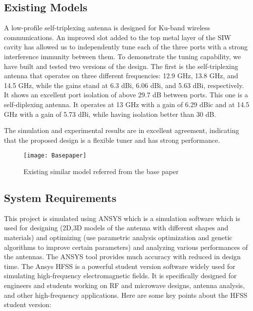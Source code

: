 \documentclass[12pt]{article}
\begin{document}

\newpage
\subsection{Existing Models}
\par A low-profile self-triplexing antenna is designed for Ku-band wireless communications. An improved slot added to the top metal layer of the SIW cavity has allowed us to independently tune each of the three ports with a strong interference immunity between them. To demonstrate the tuning capability, we have built and tested two versions of the design. The first is the self-triplexing antenna that operates on three different frequencies: 12.9 GHz, 13.8 GHz, and 14.5 GHz, while the gains stand at 6.3 dBi, 6.06 dBi, and 5.63 dBi, respectively. It shows an excellent port isolation of above 29.7 dB between ports. This one is a self-diplexing antenna. It operates at 13 GHz with a gain of 6.29 dBic and at 14.5 GHz with a gain of 5.73 dBi, while having isolation better than 30 dB.\\

\par \noindent The simulation and experimental results are in excellent agreement, indicating that the proposed design is a flexible tuner and has strong performance.\\

\begin{center}
\begin{figure}[H]
    \centering
    \texttt{[image: Basepaper]}
    \caption{Existing similar model referred from the base paper}
    \label{fig:Base paper}
\end{figure}
\end{center}


\newpage
\subsection{System Requirements}
\par This project is simulated using ANSYS which is a simulation software which is used for designing (2D,3D models of the antenna with different shapes and materials) and optimizing (use parametric analysis optimization and genetic algorithms to improve certain parameters) and analyzing various performances of the antennas. The ANSYS tool provides much accuracy with reduced in design time. The Ansys HFSS is a powerful student version software widely used for simulating high-frequency electromagnetic fields. It is specifically designed for engineers and students working on RF and microwave designs, antenna analysis, and other high-frequency applications. Here are some key points about the HFSS student version:
\end{document}
